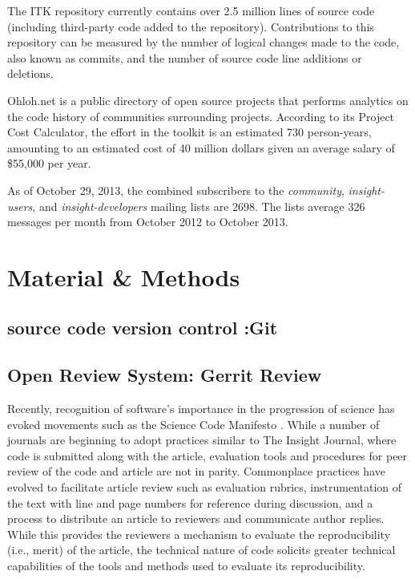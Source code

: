 \documentclass{frontiersENG} %
\begin{document}
The ITK repository currently contains over 2.5 million lines of source code (including third-party code added to the repository). Contributions to this repository can be measured by the number of logical changes made to the code, also known as commits, and the number of source code line additions or deletions.

Ohloh.net is a public directory of open source projects that performs analytics on the code history of communities surrounding projects. According to its Project Cost Calculator, the effort in the toolkit is an estimated 730 person-years, amounting to an estimated cost of 40 million dollars given an average salary of \$55,000 per year.

As of October 29, 2013, the combined subscribers to the
\textit{community}, \textit{insight-users}, and
\textit{insight-developers} mailing lists are 2698.
The lists average 326 messages per month from October 2012 to October 2013.


\section{Material \& Methods}

\subsection{source code version control :Git}

\subsection{Open Review System: Gerrit Review}
Recently, recognition of software’s importance in the progression of science has evoked movements such as the Science Code Manifesto \cite{Barnes2010}. While a number of journals are beginning to adopt practices similar to The Insight Journal, where code is submitted along with the article, evaluation tools and procedures for peer review of the code and article are not in parity.  Commonplace practices have evolved to facilitate article review such as evaluation rubrics, instrumentation of the text with line and page numbers for reference during discussion, and a process to distribute an article to reviewers and communicate author replies.  While this provides the reviewers a mechanism to evaluate the reproducibility (i.e., merit) of the article, the technical nature of code solicits greater technical capabilities of the tools and methods used to evaluate its reproducibility.
\end{document}
